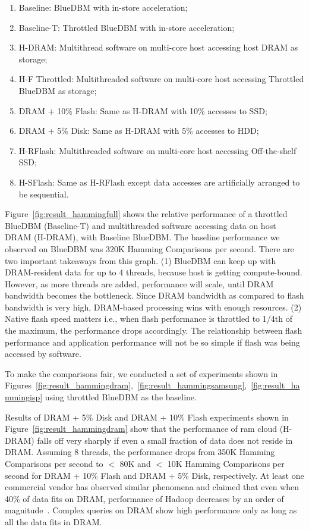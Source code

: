 \begin{enumerate}
\item Baseline: BlueDBM with in-store acceleration;
\item Baseline-T: Throttled BlueDBM with in-store acceleration;
\item H-DRAM: Multithread software on multi-core host accessing host DRAM as storage;
\item H-F Throttled: Multithreaded software on multi-core host accessing Throttled BlueDBM as storage;
\item DRAM + 10\% Flash: Same as H-DRAM with 10\% accesses to SSD; 
\item DRAM + 5\% Disk: Same as H-DRAM with 5\% accesses to HDD;
\item H-RFlash: Multithreaded software on multi-core host accessing
Off-the-shelf SSD;
\item H-SFlash: Same as H-RFlash except data accesses are artificially arranged to be sequential.
\end{enumerate}

Figure~\ref{fig:result_hammingfull} shows the relative performance of a
throttled BlueDBM (Baseline-T) and multithreaded software accessing data on
host DRAM (H-DRAM), with Baseline BlueDBM. The baseline performance we
observed on BlueDBM was 320K Hamming Comparisons per second. There are two
important takeaways from this graph. (1) BlueDBM can keep up with
DRAM-resident data for up to 4 threads, because host is getting compute-bound.
However, as more threads are added, performance will scale, until DRAM bandwidth
becomes the bottleneck. Since DRAM bandwidth as compared to flash bandwidth is
very high, DRAM-based processing wins with enough resources. (2) Native flash
speed matters i.e., when flash performance is throttled to 1/4th of the maximum, the performance drops accordingly. The relationship between flash performance and application performance will not be so simple if flash was being accessed by software.

To make the comparisons fair, we conducted a set of experiments shown in
Figures~\ref{fig:result_hammingdram},~\ref{fig:result_hammingsamsung},~\ref{fig:result_hammingisp} using throttled BlueDBM as the baseline. 

Results of DRAM + 5\% Disk and DRAM + 10\% Flash experiments shown in
Figure~\ref{fig:result_hammingdram} show that the performance of ram cloud (H-DRAM) falls off very sharply if even a small fraction of data does not reside in DRAM. Assuming 8 threads, the performance drops from 350K Hamming Comparisons per second to $<$ 80K and $<$ 10K Hamming Comparisons per second for DRAM + 10\% Flash and DRAM + 5\% Disk, respectively. At least one commercial vendor has observed similar phenomena and claimed that even when 40\% of data fits on DRAM, performance of Hadoop decreases by an order of magnitude~\cite{fusioniodram}. Complex queries on DRAM show high performance only as long as all the data fits in DRAM. 

